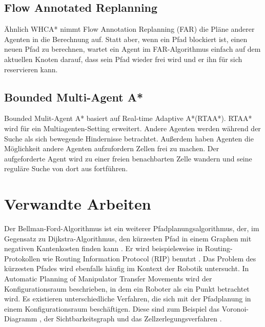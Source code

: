 \subsection{Flow Annotated Replanning}
Ähnlich WHCA* nimmt Flow Annotation Replanning (FAR) die Pläne anderer Agenten in die Berechnung auf. Statt aber, wenn ein Pfad blockiert ist, einen neuen Pfad zu berechnen, wartet ein Agent im FAR-Algorithmus einfach auf dem aktuellen Knoten darauf, dass sein Pfad wieder frei wird und er ihn für sich reservieren kann.

\subsection{Bounded Multi-Agent A*}
Bounded Mulit-Agent A* basiert auf Real-time Adaptive A*(RTAA*). RTAA* wird für ein Multiagenten-Setting erweitert. Andere Agenten werden während der Suche als sich bewegende Hindernisse betrachtet. Außerdem haben Agenten die Möglichkeit andere Agenten aufzufordern Zellen frei zu machen. Der aufgeforderte Agent wird zu einer freien benachbarten Zelle wandern und seine reguläre Suche von dort aus fortführen\cite{Sigurdson.2019}.

\section{Verwandte Arbeiten}

\begin{sloppypar}
	
Der Bellman-Ford-Algorithmus ist ein weiterer Pfadplanungsalgorithmus, der, im Gegensatz zu Dijkstra-Algorithmus, den kürzesten Pfad in einem Graphen mit negativen Kantenkosten finden kann \cite{Bel58}. Er wird beispielsweise in Routing-Protokollen wie Routing Information Protocol (RIP) benutzt \cite{Hed88}.
Das Problem des kürzesten Pfades wird ebenfalls häufig im Kontext der Robotik untersucht. In Automatic Planning of Manipulator Transfer Movements \cite{LP80} wird der Konfigurationsraum beschrieben, in dem ein Roboter als ein Punkt betrachtet wird. Es existieren unterschiedliche Verfahren, die sich mit der Pfadplanung in einem Konfigurationsraum beschäftigen. Diese sind zum Beispiel das Voronoi-Diagramm \cite{Lee82}, der Sichtbarkeitsgraph \cite{LPAW79} und das Zellzerlegungsverfahren \cite{Cai09} .
\end{sloppypar}
